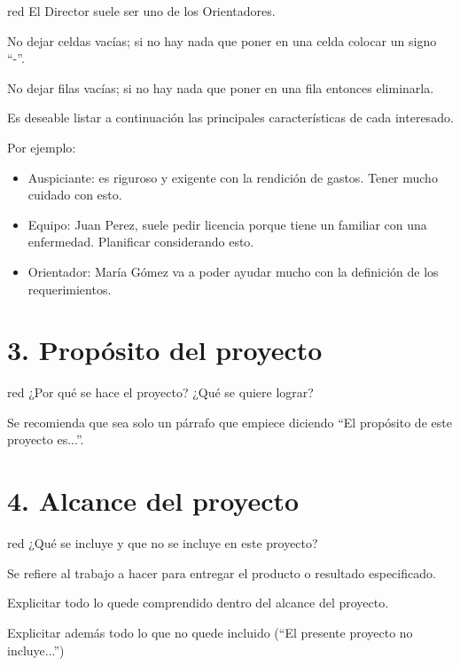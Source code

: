 \documentclass[
11pt, %
codirector, %
]{charter}
\begin{document}
\begin{consigna}{red}
El Director suele ser uno de los Orientadores.

No dejar celdas vacías; si no hay nada que poner en una celda colocar un signo ``-''.

No dejar filas vacías; si no hay nada que poner en una fila entonces eliminarla.

Es deseable listar a continuación las principales características de cada interesado.
 
Por ejemplo:
\begin{itemize}
	\item Auspiciante: es riguroso y exigente con la rendición de gastos. Tener mucho cuidado con esto.
	\item Equipo: Juan Perez, suele pedir licencia porque tiene un familiar con una enfermedad. Planificar considerando esto.
	\item Orientador: María Gómez va a poder ayudar mucho con la definición de los requerimientos.
\end{itemize}

\end{consigna} %



\section{3. Propósito del proyecto}
\label{sec:proposito}

\begin{consigna}{red}
¿Por qué se hace el proyecto? ¿Qué se quiere lograr? 

Se recomienda que sea solo un párrafo que empiece diciendo ``El propósito de este proyecto es...''.
\end{consigna}

\section{4. Alcance del proyecto}
\label{sec:alcance}

\begin{consigna}{red}
¿Qué se incluye y que no se incluye en este proyecto?

Se refiere al trabajo a hacer para entregar el producto o resultado especificado. 

Explicitar todo lo quede comprendido dentro del alcance del proyecto.

Explicitar además todo lo que no quede incluido (``El presente proyecto no incluye...'')

\end{consigna}
\end{document}
